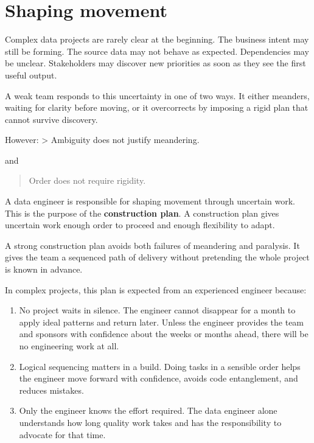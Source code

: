 \documentclass[10pt,openany,10pt]{book}
\begin{document}
\section{Shaping movement}\label{shaping-movement}

Complex data projects are rarely clear at the beginning. The business
intent may still be forming. The source data may not behave as expected.
Dependencies may be unclear. Stakeholders may discover new priorities as
soon as they see the first useful output.

A weak team responds to this uncertainty in one of two ways. It either
meanders, waiting for clarity before moving, or it overcorrects by
imposing a rigid plan that cannot survive discovery.

However: \textgreater{} Ambiguity does not justify meandering.

and

\begin{quote}
Order does not require rigidity.
\end{quote}

A data engineer is responsible for shaping movement through uncertain
work. This is the purpose of the \textbf{construction plan}. A
construction plan gives uncertain work enough order to proceed and
enough flexibility to adapt.

A strong construction plan avoids both failures of meandering and
paralysis. It gives the team a sequenced path of delivery without
pretending the whole project is known in advance.

In complex projects, this plan is expected from an experienced engineer
because:

\begin{enumerate}
\def\labelenumi{\arabic{enumi}.}
\item
  No project waits in silence. The engineer cannot disappear for a month
  to apply ideal patterns and return later. Unless the engineer provides
  the team and sponsors with confidence about the weeks or months ahead,
  there will be no engineering work at all.
\item
  Logical sequencing matters in a build. Doing tasks in a sensible order
  helps the engineer move forward with confidence, avoids code
  entanglement, and reduces mistakes.
\item
  Only the engineer knows the effort required. The data engineer alone
  understands how long quality work takes and has the responsibility to
  advocate for that time.
\end{enumerate}
\end{document}
